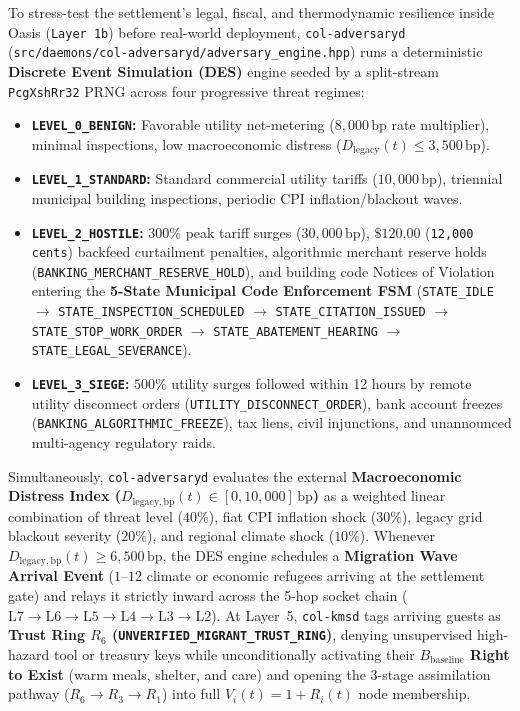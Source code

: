 To stress-test the settlement's legal, fiscal, and thermodynamic resilience inside Oasis (\texttt{Layer~1b}) before real-world deployment, \texttt{col-adversaryd} (\texttt{src/daemons/col-adversaryd/adversary\_engine.hpp}) runs a deterministic \textbf{Discrete Event Simulation (DES)} engine seeded by a split-stream \texttt{PcgXshRr32} PRNG across four progressive threat regimes:
\begin{itemize}
    \item \textbf{\texttt{LEVEL\_0\_BENIGN}:} Favorable utility net-metering ($8{,}000\,\mathrm{bp}$ rate multiplier), minimal inspections, low macroeconomic distress ($D_{\mathrm{legacy}}(t) \le 3{,}500\,\mathrm{bp}$).
    \item \textbf{\texttt{LEVEL\_1\_STANDARD}:} Standard commercial utility tariffs ($10{,}000\,\mathrm{bp}$), triennial municipal building inspections, periodic CPI inflation/blackout waves.
    \item \textbf{\texttt{LEVEL\_2\_HOSTILE}:} $300\%$ peak tariff surges ($30{,}000\,\mathrm{bp}$), $\$120.00$ (\texttt{12,000 cents}) backfeed curtailment penalties, algorithmic merchant reserve holds (\texttt{BANKING\_MERCHANT\_RESERVE\_HOLD}), and building code Notices of Violation entering the \textbf{5-State Municipal Code Enforcement FSM} (\texttt{STATE\_IDLE} $\to$ \texttt{STATE\_INSPECTION\_SCHEDULED} $\to$ \texttt{STATE\_CITATION\_ISSUED} $\to$ \texttt{STATE\_STOP\_WORK\_ORDER} $\to$ \texttt{STATE\_ABATEMENT\_HEARING} $\to$ \texttt{STATE\_LEGAL\_SEVERANCE}).
    \item \textbf{\texttt{LEVEL\_3\_SIEGE}:} $500\%$ utility surges followed within 12 hours by remote utility disconnect orders (\texttt{UTILITY\_DISCONNECT\_ORDER}), bank account freezes (\texttt{BANKING\_ALGORITHMIC\_FREEZE}), tax liens, civil injunctions, and unannounced multi-agency regulatory raids.
\end{itemize}

Simultaneously, \texttt{col-adversaryd} evaluates the external \textbf{Macroeconomic Distress Index ($D_{\mathrm{legacy,bp}}(t) \in [0, 10{,}000]\,\mathrm{bp}$)} as a weighted linear combination of threat level ($40\%$), fiat CPI inflation shock ($30\%$), legacy grid blackout severity ($20\%$), and regional climate shock ($10\%$). Whenever $D_{\mathrm{legacy,bp}}(t) \ge 6{,}500\,\mathrm{bp}$, the DES engine schedules a \textbf{Migration Wave Arrival Event} ($1\text{--}12$ climate or economic refugees arriving at the settlement gate) and relays it strictly inward across the 5-hop socket chain ($\mathrm{L7} \to \mathrm{L6} \to \mathrm{L5} \to \mathrm{L4} \to \mathrm{L3} \to \mathrm{L2}$). At Layer~5, \texttt{col-kmsd} tags arriving guests as \textbf{Trust Ring $R_6$ (\texttt{UNVERIFIED\_MIGRANT\_TRUST\_RING})}, denying unsupervised high-hazard tool or treasury keys while unconditionally activating their \textbf{$B_{\mathrm{baseline}}$ Right to Exist} (warm meals, shelter, and care) and opening the 3-stage assimilation pathway ($R_6 \to R_3 \to R_1$) into full $V_i(t) = 1 + R_i(t)$ node membership.
